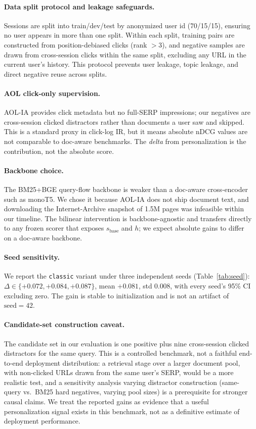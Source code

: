 \paragraph{Data split protocol and leakage safeguards.}
Sessions are split into train/dev/test by anonymized user id (70/15/15), ensuring no user appears in more than one split. Within each split, training pairs are constructed from position-debiased clicks (rank $> 3$), and negative samples are drawn from cross-session clicks within the same split, excluding any URL in the current user's history. This protocol prevents user leakage, topic leakage, and direct negative reuse across splits.

\paragraph{AOL click-only supervision.}
AOL-IA provides click metadata but no full-SERP impressions; our negatives are cross-session clicked distractors rather than documents a user saw and skipped. This is a standard proxy in click-log IR, but it means absolute nDCG values are not comparable to doc-aware benchmarks. The \emph{delta} from personalization is the contribution, not the absolute score.

\paragraph{Backbone choice.}
The BM25+BGE query-flow backbone is weaker than a doc-aware cross-encoder such as monoT5. We chose it because AOL-IA does not ship document text, and downloading the Internet-Archive snapshot of 1.5M pages was infeasible within our timeline. The bilinear intervention is backbone-agnostic and transfers directly to any frozen scorer that exposes $s_{\mathrm{base}}$ and $h$; we expect absolute gains to differ on a doc-aware backbone.

\paragraph{Seed sensitivity.}
We report the \texttt{classic} variant under three independent seeds (Table~\ref{tab:seed}): $\Delta \in \{+0.072, +0.084, +0.087\}$, mean $+0.081$, std $0.008$, with every seed's 95\% CI excluding zero. The gain is stable to initialization and is not an artifact of $\text{seed}{=}42$.

\paragraph{Candidate-set construction caveat.}
The candidate set in our evaluation is one positive plus nine cross-session clicked distractors for the same query. This is a controlled benchmark, not a faithful end-to-end deployment distribution: a retrieval stage over a larger document pool, with non-clicked URLs drawn from the same user's SERP, would be a more realistic test, and a sensitivity analysis varying distractor construction (same-query vs.\ BM25 hard negatives, varying pool sizes) is a prerequisite for stronger causal claims. We treat the reported gains as evidence that a useful personalization signal exists in this benchmark, not as a definitive estimate of deployment performance.

